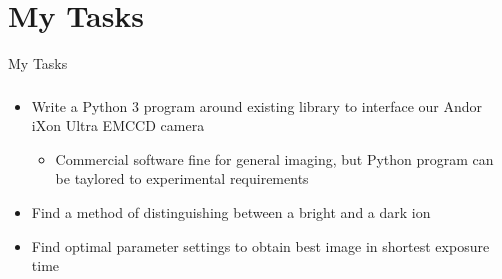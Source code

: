 \documentclass{beamer}
\begin{document}

\section{My Tasks}

\begin{frame}{My Tasks}
\frametitle{}
\begin{itemize}
\item Write a Python 3 program around existing library to interface our Andor iXon Ultra EMCCD camera
	\begin{itemize}
	\item Commercial software fine for general imaging, but Python program can be taylored to experimental requirements
	\end{itemize}
\bigskip
\item Find a method of distinguishing between a bright and a dark ion
\bigskip
\item Find optimal parameter settings to obtain best image in shortest exposure time
\end{itemize}


\end{frame}

\end{document}
